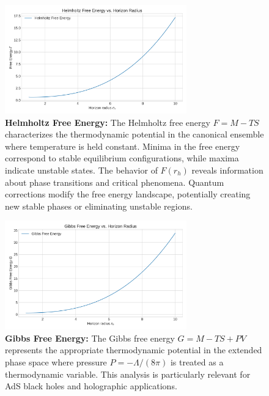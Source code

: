 \documentclass[superscriptaddress, prd, aps,amsmath,amssymb,showpacs,showkeys, onecolumn]{revtex4-2}
\begin{document}
\begin{figure}[H]
    \centering
    \includegraphics[width=0.7\textwidth]{figures/free_energy_vs_rh.png}
    \caption{\textbf{Helmholtz Free Energy:} The Helmholtz free energy $F = M - TS$ characterizes the thermodynamic potential in the canonical ensemble where temperature is held constant. Minima in the free energy correspond to stable equilibrium configurations, while maxima indicate unstable states. The behavior of $F(r_h)$ reveals information about phase transitions and critical phenomena. Quantum corrections modify the free energy landscape, potentially creating new stable phases or eliminating unstable regions.}
    \label{fig:free_energy_vs_rh}
\end{figure}

\begin{figure}[H]
    \centering
    \includegraphics[width=0.7\textwidth]{figures/gibbs_energy_vs_rh.png}
    \caption{\textbf{Gibbs Free Energy:} The Gibbs free energy $G = M - TS + PV$ represents the appropriate thermodynamic potential in the extended phase space where pressure $P = -\Lambda/(8\pi)$ is treated as a thermodynamic variable. This analysis is particularly relevant for AdS black holes and holographic applications.}
    \label{fig:gibbs_energy_vs_rh}
\end{figure}
\end{document}
